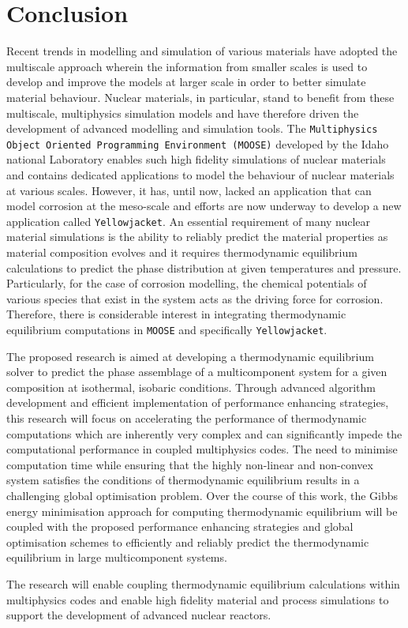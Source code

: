 \chapter{Conclusion}
\label{conclusion}

	Recent trends in modelling and simulation of various materials have adopted the multiscale approach wherein the information from smaller scales is used to develop and improve the models at larger scale in order to better simulate material behaviour. Nuclear materials, in particular, stand to benefit from these multiscale, multiphysics simulation models and have therefore driven the development of advanced modelling and simulation tools. The \texttt{Multiphysics Object Oriented Programming Environment (MOOSE)} developed by the Idaho national Laboratory enables such high fidelity simulations of nuclear materials and contains dedicated applications to model the behaviour of nuclear materials at various scales. However, it has, until now, lacked an application that can model corrosion at the meso-scale and efforts are now underway to develop a new application called \texttt{Yellowjacket}. An essential requirement of many nuclear material simulations is the ability to reliably predict the material properties as material composition evolves and it requires thermodynamic equilibrium calculations to predict the phase distribution at given temperatures and pressure. Particularly, for the case of corrosion modelling, the chemical potentials of various species that exist in the system acts as the driving force for corrosion. Therefore, there is considerable interest in integrating thermodynamic equilibrium computations in \texttt{MOOSE} and specifically \texttt{Yellowjacket}.
	
	The proposed research is aimed at developing a thermodynamic equilibrium solver to predict the phase assemblage of a multicomponent system for a given composition at isothermal, isobaric conditions. Through advanced algorithm development and efficient implementation of performance enhancing strategies, this research will focus on accelerating the performance of thermodynamic computations which are inherently very complex and can significantly impede the computational performance in coupled multiphysics codes. The need to minimise computation time while ensuring that the highly non-linear and non-convex system satisfies the conditions of thermodynamic equilibrium results in a challenging global optimisation problem. Over the course of this work, the Gibbs energy minimisation approach for computing thermodynamic equilibrium will be coupled with the proposed performance enhancing strategies and global optimisation schemes to efficiently and reliably predict the thermodynamic  equilibrium in large multicomponent systems. 
	
	The research will enable coupling thermodynamic equilibrium calculations within multiphysics codes and enable high fidelity material and process simulations to support the development of advanced nuclear reactors.
	
	
	
	